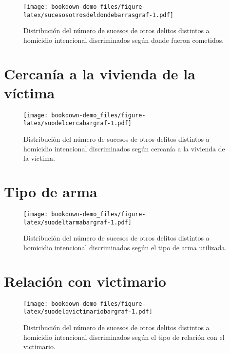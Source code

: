 \documentclass[
]{book}
\begin{document}
\begin{figure}
\centering
\texttt{[image: bookdown-demo\_files/figure-latex/sucesosotrosdeldondebarrasgraf-1.pdf]}
\caption{\label{fig:sucesosotrosdeldondebarrasgraf}Distribución del número de sucesos de otros delitos distintos a homicidio intencional discriminados según donde fueron cometidos.}
\end{figure}

\hypertarget{cercanuxeda-a-la-vivienda-de-la-vuxedctima}{%
\section{Cercanía a la vivienda de la víctima}\label{cercanuxeda-a-la-vivienda-de-la-vuxedctima}}



\begin{figure}
\centering
\texttt{[image: bookdown-demo\_files/figure-latex/suodelcercabargraf-1.pdf]}
\caption{\label{fig:suodelcercabargraf}Distribución del número de sucesos de otros delitos distintos a homicidio intencional discriminados según cercanía a la vivienda de la víctima.}
\end{figure}

\hypertarget{tipo-de-arma-1}{%
\section{Tipo de arma}\label{tipo-de-arma-1}}



\begin{figure}
\centering
\texttt{[image: bookdown-demo\_files/figure-latex/suodeltarmabargraf-1.pdf]}
\caption{\label{fig:suodeltarmabargraf}Distribución del número de sucesos de otros delitos distintos a homicidio intencional discriminados según el tipo de arma utilizada.}
\end{figure}

\hypertarget{relaciuxf3n-con-victimario}{%
\section{Relación con victimario}\label{relaciuxf3n-con-victimario}}



\begin{figure}
\centering
\texttt{[image: bookdown-demo\_files/figure-latex/suodelqvictimariobargraf-1.pdf]}
\caption{\label{fig:suodelqvictimariobargraf}Distribución del número de sucesos de otros delitos distintos a homicidio intencional discriminados según el tipo de relación con el victimario.}
\end{figure}
\end{document}
